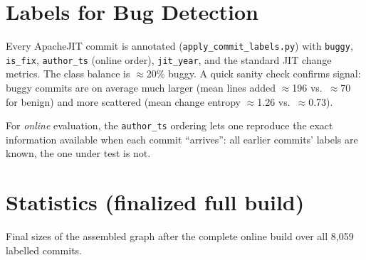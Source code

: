 \documentclass[11pt,a4paper]{article}
\newcommand{\code}[1]{\texttt{#1}}
\begin{document}
	\section{Labels for Bug Detection}
	Every ApacheJIT commit is annotated (\texttt{apply\_commit\_labels.py}) with
	\code{buggy}, \code{is\_fix}, \code{author\_ts} (online order), \code{jit\_year},
	and the standard JIT change metrics. The class balance is $\approx$20\% buggy.
	A quick sanity check confirms signal: buggy commits are on average much larger
	(mean lines added $\approx$196 vs.\ $\approx$70 for benign) and more scattered
	(mean change entropy $\approx$1.26 vs.\ $\approx$0.73).
	
	For \emph{online} evaluation, the \code{author\_ts} ordering lets one reproduce
	the exact information available when each commit ``arrives'': all earlier
	commits' labels are known, the one under test is not.
	
	\section{Statistics (finalized full build)}
	Final sizes of the assembled graph after the complete online build over all
	8{,}059 labelled commits.
	
\end{document}
